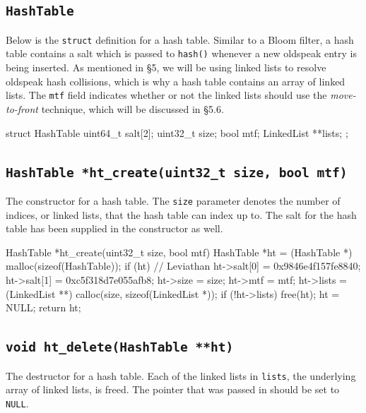 \documentclass{article}
\begin{document}
\subsection{\texttt{HashTable}}

Below is the \texttt{struct} definition for a hash table. Similar to a
Bloom filter, a hash table contains a salt which is passed to
\texttt{hash()} whenever a new oldspeak entry is being inserted. As
mentioned in \S 5, we will be using linked lists to resolve oldspeak
hash collisions, which is why a hash table contains an array of linked
lists. The \texttt{mtf} field indicates whether or not the linked
lists should use the \emph{move-to-front} technique, which will be
discussed in \S 5.6.

\begin{codelisting}{}
struct HashTable {
  uint64_t salt[2];
  uint32_t size;
  bool mtf;
  LinkedList **lists;
};
\end{codelisting}

\subsection{\texttt{HashTable *ht\_create(uint32\_t size, bool mtf)}}

The constructor for a hash table. The \texttt{size} parameter denotes
the number of indices, or linked lists, that the hash table can index up
to. The salt for the hash table has been supplied in the constructor as
well.

\begin{codelisting}{}
HashTable *ht_create(uint32_t size, bool mtf) {
  HashTable *ht = (HashTable *) malloc(sizeof(HashTable));
  if (ht) {
    // Leviathan
    ht->salt[0] = 0x9846e4f157fe8840;
    ht->salt[1] = 0xc5f318d7e055afb8;
    ht->size = size;
    ht->mtf = mtf;
    ht->lists = (LinkedList **) calloc(size, sizeof(LinkedList *));
    if (!ht->lists) {
      free(ht);
      ht = NULL;
    }
  }
  return ht;
}
\end{codelisting}

\subsection{\texttt{void ht\_delete(HashTable **ht)}}

The destructor for a hash table. Each of the linked lists in
\texttt{lists}, the underlying array of linked lists, is freed.
The pointer that was passed in should be set to \texttt{NULL}.
\end{document}
